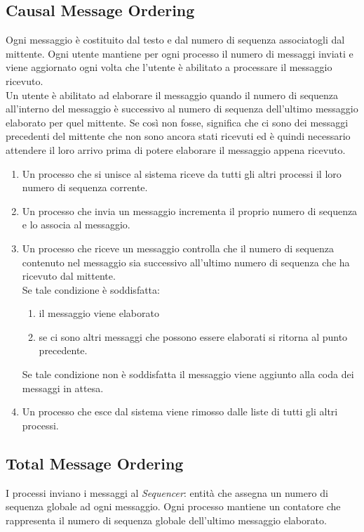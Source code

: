 \documentclass[a4paper]{report}
\begin{document}
\subsection{Causal Message Ordering}\label{causal-message-ordering}

Ogni messaggio è costituito dal testo e dal numero di sequenza associatogli dal mittente.
Ogni utente mantiene per ogni processo il numero di messaggi inviati e viene aggiornato ogni volta che l'utente è abilitato a processare il messaggio ricevuto.\\
Un utente è abilitato ad elaborare il messaggio quando il numero di sequenza all'interno del messaggio è successivo al numero di sequenza dell'ultimo messaggio elaborato per quel mittente.
Se così non fosse, significa che ci sono dei messaggi precedenti del mittente che non sono ancora stati ricevuti ed è quindi necessario attendere il loro arrivo prima di potere elaborare il messaggio appena ricevuto.
\begin{enumerate}
    \item Un processo che si unisce al sistema riceve da tutti gli altri processi il loro numero di sequenza corrente.
    \item Un processo che invia un messaggio incrementa il proprio numero di sequenza e lo associa al messaggio.
    \item Un processo che riceve un messaggio controlla che il numero di sequenza contenuto nel messaggio sia successivo all'ultimo numero di sequenza che ha ricevuto dal mittente.\\
    Se tale condizione è soddisfatta:
    \begin{enumerate}
        \item il messaggio viene elaborato
        \item se ci sono altri messaggi che possono essere elaborati si ritorna al punto precedente.
    \end{enumerate}
    Se tale condizione non è soddisfatta il messaggio viene aggiunto alla coda dei messaggi in attesa.
    \item Un processo che esce dal sistema viene rimosso dalle liste di tutti gli altri processi.
\end{enumerate}

\subsection{Total Message Ordering}\label{total-message-ordering}

I processi inviano i messaggi al \textit{Sequencer}: entità che assegna un numero di sequenza globale ad ogni messaggio.
Ogni processo mantiene un contatore che rappresenta il numero di sequenza globale dell'ultimo messaggio elaborato.
\end{document}
